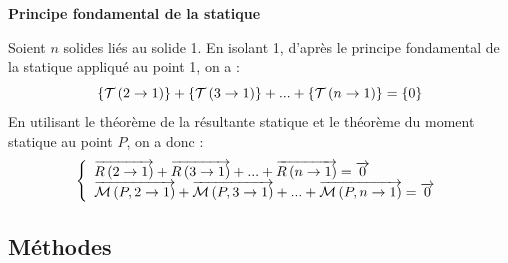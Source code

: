\documentclass[10pt]{article}
\begin{document}
\begin{defi}

\textbf{Principe fondamental de la statique}

Soient $n$ solides liés au solide 1. En isolant 1, d'après le principe fondamental de la statique appliqué au point 1, on a : 
$$
\torseurstat{T}{2}{1} + \torseurstat{T}{3}{1} + ... + \torseurstat{T}{n}{1}
=\{0\}
$$
En utilisant le théorème de la résultante statique et le théorème du moment statique au point $P$, on a donc : 
$$
\left\{
\begin{array}{l}
\vectf{2}{1} +\vectf{3}{1} +  ... +\vectf{n}{1} = \vect{0} \\
\vectm{P}{2}{1} + \vectm{P}{3}{1} + ... + \vectm{P}{n}{1} = \vect{0}
\end{array}
\right.
$$
\end{defi}

\subsection{Méthodes}
\end{document}

